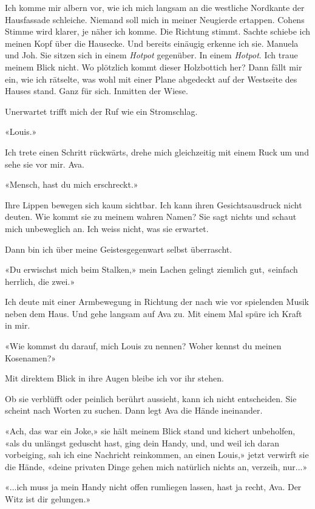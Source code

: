 Ich komme mir albern vor, wie ich mich langsam an die westliche
Nordkante der Hausfassade schleiche. Niemand soll mich in meiner
Neugierde ertappen. Cohens Stimme wird klarer, je näher ich komme. Die
Richtung stimmt. Sachte schiebe ich meinen Kopf über die Hausecke. Und
bereits einäugig erkenne ich sie. Manuela und Joh. Sie sitzen sich in
einem \emph{Hotpot} gegenüber. In einem \emph{Hotpot}. Ich traue meinem
Blick nicht. Wo plötzlich kommt dieser Holzbottich her? Dann fällt mir
ein, wie ich rätselte, was wohl mit einer Plane abgedeckt auf der
Westseite des Hauses stand. Ganz für sich. Inmitten der Wiese.

Unerwartet trifft mich der Ruf wie ein Stromschlag.

«Louis.»

Ich trete einen Schritt rückwärts, drehe mich gleichzeitig mit einem
Ruck um und sehe sie vor mir. Ava.

«Mensch, hast du mich erschreckt.»

Ihre Lippen bewegen sich kaum sichtbar. Ich kann ihren Gesichtsausdruck
nicht deuten. Wie kommt sie zu meinem wahren Namen? Sie sagt nichts und
schaut mich unbeweglich an. Ich weiss nicht, was sie erwartet.

Dann bin ich über meine Geistesgegenwart selbst überrascht.

«Du erwischst mich beim Stalken,» mein Lachen gelingt ziemlich gut,
«einfach herrlich, die zwei.»

Ich deute mit einer Armbewegung in Richtung der nach wie vor spielenden
Musik neben dem Haus. Und gehe langsam auf Ava zu. Mit einem Mal spüre
ich Kraft in mir.

«Wie kommst du darauf, mich Louis zu nennen? Woher kennst du meinen
Kosenamen?»

Mit direktem Blick in ihre Augen bleibe ich vor ihr stehen.

Ob sie verblüfft oder peinlich berührt aussieht, kann ich nicht
entscheiden. Sie scheint nach Worten zu suchen. Dann legt Ava die Hände
ineinander.

«Ach, das war ein Joke,» sie hält meinem Blick stand und kichert
unbeholfen, «als du unlängst geduscht hast, ging dein Handy, und, und
weil ich daran vorbeiging, sah ich eine Nachricht reinkommen, an einen
Louis,» jetzt verwirft sie die Hände, «deine privaten Dinge gehen mich
natürlich nichts an, verzeih, nur...»

«...ich muss ja mein Handy nicht offen rumliegen lassen, hast ja recht,
Ava. Der Witz ist dir gelungen.»


